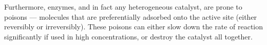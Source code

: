 				Furthermore, enzymes, and in fact any heterogeneous catalyst, are prone to poisons --- molecules that are preferentially
				adsorbed onto the active site (either reversibly or irreversibly). These poisons can either slow down the rate of reaction
				significantly if used in high concentrations, or destroy the catalyst all together.

















